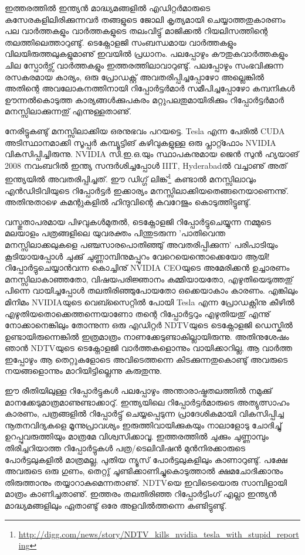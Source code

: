 ഇത്തരത്തില്‍ ഇന്ത്യന്‍ മാദ്ധ്യമങ്ങളില്‍ എഡിറ്റര്‍മാരുടെ കസേരകളിലിരിക്കുന്നവര്‍ തങ്ങളുടെ ജോലി കൃത്യമായി 
ചെയ്യാത്തതുകാരണം പല വാര്‍ത്തകളും വാര്‍ത്തകളുടെ തലംവിട്ടു് മാജിക്കല്‍ റിയലിസത്തിന്റെ തലത്തിലെത്താറുണ്ടു്. 
ടെക്നോളജി സംബന്ധമായ വാര്‍ത്തകളും വിലയിരുത്തലുകളുമാണു് ഇവയില്‍ പ്രധാനം. പലപ്പോഴും കൗതുകവാര്‍ത്തകളും 
ചില സ്പോര്‍ട്സ് വാര്‍ത്തകളും ഇത്തരത്തിലാവാറുണ്ടു്. പലപ്പോഴും സംഭവിക്കുന്ന രസകരമായ കാര്യം,  
ഒരു പ്രോഡക്റ്റ് അവതരിപ്പിച്ചപ്പോഴോ അല്ലെങ്കില്‍ അതിന്റെ അവലോകനത്തിനായി 
റിപ്പോര്‍ട്ടര്‍മാര്‍ സമീപിച്ചപ്പോഴോ കമ്പനികള്‍ ഊന്നല്‍കൊടുത്ത കാര്യങ്ങള്‍ക്കുപകരം മറ്റുപലതുമായിരിക്കും 
റിപ്പോര്‍ട്ടര്‍മാര്‍ മനസ്സിലാക്കുന്നതു് എന്നുള്ളതാണു്.

നേരിട്ടുകണ്ടു് മനസ്സിലാക്കിയ ഒരനുഭവം പറയട്ടെ.  Tesla എന്ന പേരില്‍ CUDA അടിസ്ഥാനമാക്കി 
സൂപ്പര്‍ കമ്പ്യൂട്ടിങ് കഴിവുകളുള്ള ഒരു പ്ലാറ്റ്ഫോം NVIDIA വികസിപ്പിച്ചിരുന്നു. NVIDIA സി.ഇ.ഒ.യും സ്ഥാപകനുമായ ജെന്‍ സുന്‍ 
ഹ്യയാങ് 2008 നവംബറില്‍ ഇന്ത്യ സന്ദര്‍ശിച്ചപ്പോള്‍ IIIT, Hyderabadല്‍ വച്ചാണു് അത് ഇന്ത്യയില്‍ 
അവതരിപ്പിച്ചത്. ഈ ഡിഗ്ഗ് 
ലിങ്ക്\footnote{\url{http://digg.com/news/story/NDTV_kills_nvidia_tesla_with_stupid_reporting}}
കണ്ടാല്‍ മനസ്സിലാവും എന്‍ഡിടിവിയുടെ റിപ്പോര്‍ട്ടര്‍ ഇക്കാര്യം 
മനസ്സിലാക്കിയതെങ്ങനെയാണെന്നു്. അതിനുതാഴെ കമന്റുകളില്‍ ഹിന്ദുവിന്റെ കവറേജും കൊടുത്തിട്ടുണ്ടു്.

വസ്തുതാപരമായ പിഴവുകള്‍മുതല്‍, ടെക്നോളജി റിപ്പോര്‍ട്ടുചെയ്യുന്ന നമ്മുടെ മലയാളം പത്രങ്ങളിലെ യുവരക്തം 
പിന്തുടരുന്ന 'പാതിവെന്ത മനസ്സിലാക്കലുകളെ പഞ്ചസാരപൊതിഞ്ഞു് അവതരിപ്പിക്കുന്ന' പരിപാടിയും കൂടിയായപ്പോള്‍ 
ചുക്കു് ചുണ്ണാമ്പിനുമപ്പുറം വേറെയെന്തൊക്കെയോ ആയി! റിപ്പോര്‍ട്ടുചെയ്യാന്‍വന്ന കൊച്ചിനു് NVIDIA CEOയുടെ 
അമേരിക്കന്‍ ഉച്ചാരണം മനസ്സിലാകാഞ്ഞതോ, വിഷയപരിജ്ഞാനം കമ്മിയായതോ, എഴുതിയെടുത്തതു് പിന്നെ 
വായിച്ചപ്പോള്‍ തലതിരിഞ്ഞുപോയതോ ഒക്കെയാകാം കാരണം. എങ്കിലും മിനിമം NVIDIAയുടെ വെബ്സൈറ്റില്‍ പോയി Tesla 
എന്ന പ്രോഡക്റ്റിനു കീഴില്‍ എഴുതിയതൊക്കെത്തന്നെയാണോ തന്റെ റിപ്പോര്‍ട്ടറും എഴുതിയതു് എന്നു് നോക്കാനെങ്കിലും 
തോന്നുന്ന ഒരു എഡിറ്റര്‍ NDTVയുടെ ടെക്നോളജി ഡെസ്കില്‍ ഉണ്ടായിരുന്നെങ്കില്‍ ഇത്രമാത്രം 
നാണക്കേടുണ്ടാകില്ലായിരുന്നു. അതിനുശേഷം ഞാന്‍ NDTVയുടെ ടെക്നോളജി വാര്‍ത്തകളൊന്നും വായിക്കാറില്ല, 
ആ വാര്‍ത്ത ഇപ്പോഴും ആ തെറ്റുകളോടെ അവിടെത്തന്നെ കിടക്കുന്നതുകൊണ്ടു് അവരുടെ നയങ്ങളൊന്നും 
മാറിയിട്ടില്ലെന്നു കരുതുന്നു.

ഈ രീതിയിലുള്ള റിപ്പോര്‍ട്ടുകള്‍ പലപ്പോഴും അന്താരാഷ്ട്രതലത്തില്‍ നമുക്കു് മാനക്കേടുമാത്രമാണുണ്ടാക്കാറു്. ഇന്ത്യയിലെ 
റിപ്പോര്‍ട്ടര്‍മാരുടെ അത്യുത്സാഹം കാരണം, പത്രങ്ങളില്‍ റിപ്പോര്‍ട്ടു് ചെയ്യപ്പെടുന്ന പ്രാദേശികമായി വികസിപ്പിച്ച നൂതനവിദ്യകളെ 
മൂന്നുപ്രാവശ്യം ഇരുത്തിവായിക്കുകയും നാലാളോടു ചോദിച്ചു് ഉറപ്പുവരുത്തിയും മാത്രമേ വിശ്വസിക്കാവൂ.
 ഇത്തരത്തില്‍ ചുക്കും ചുണ്ണാമ്പും തിരിച്ചറിയാത്ത റിപ്പോര്‍ട്ടുകള്‍ പത്ര/ടെലിവിഷന്‍ മുന്‍നിരക്കാരുടെ 
പോര്‍ട്ടലുകളില്‍ മാത്രമല്ല, പുതിയ ന്യൂസ് പോര്‍ട്ടലുകളിലും കാണാറുണ്ടു്. പക്ഷേ അവരുടെ ഒരു ഗുണം, തെറ്റു് 
ചൂണ്ടിക്കാണിച്ചുകൊടുത്താല്‍ ക്ഷമചോദിക്കാനും തിരുത്താനും തയ്യാറാകുമെന്നതാണു്. NDTVയെ ഇവിടെയൊരു 
സാമ്പിളായി മാത്രം കാണിച്ചതാണു്. ഇത്തരം തലതിരിഞ്ഞ റിപ്പോര്‍ട്ടിംഗ് എല്ലാ ഇന്ത്യന്‍ മാദ്ധ്യമങ്ങളിലും ഏതാണ്ടു് ഒരേ 
അളവില്‍ത്തന്നെ കണ്ടിട്ടുണ്ടു്.

